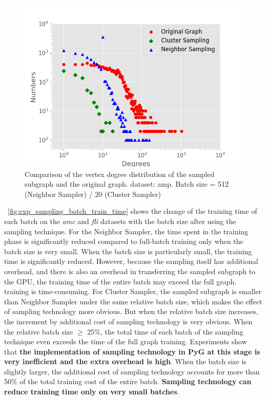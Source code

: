 \begin{figure}
    \centering
    \includegraphics[width=0.7\columnwidth]{figs/experiments/exp_sampling_minibatch_degrees_distribution_amazon-photo.png}
    \caption{Comparison of the vertex degree distribution of the sampled subgraph and the original graph. dataset: amp. Batch size = 512 (Neighbor Sampler) / 20 (Cluster Sampler)}
    \label{fig:exp_sampling_minibatch_degrees_distribution}
\end{figure}

\figurename~\ref{fig:exp_sampling_batch_train_time} shows the change of the training time of each batch on the \textit{amc} and \textit{fli} datasets with the batch size after using the sampling technique.
For the Neighbor Sampler, the time spent in the training phase is significantly reduced compared to full-batch training only when the batch size is very small.
When the batch size is particularly small, the training time is significantly reduced. However, because the sampling itself has additional overhead,
and there is also an overhead in transferring the sampled subgraph to the GPU, the training time of the entire batch may exceed the full graph.
training is time-consuming. For Cluster Sampler, the sampled subgraph is smaller than Neighbor Sampler under the same relative batch size,
which makes the effect of sampling technology more obvious. But when the relative batch size increases,
the increment by additional cost of sampling technology is very obvious. When the relative batch size $\geq$ 25\%,
the total time of each batch of the sampling technique even exceeds the time of the full graph training.
Experiments show that \textbf{the implementation of sampling technology in PyG at this stage is very inefficient and the extra overhead is high}.
When the batch size is slightly larger, the additional cost of sampling technology accounts for more than 50\% of the total training cost of the entire batch.
\textbf{Sampling technology can reduce training time only on very small batches}.

